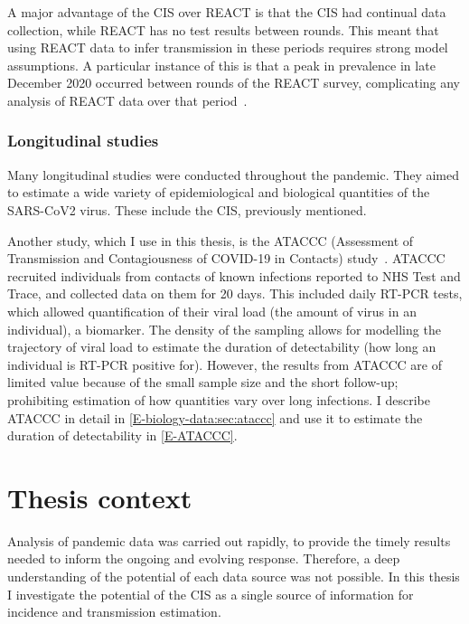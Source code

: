 \documentclass[thesis.tex]{subfiles}
\begin{document}
A major advantage of the CIS over REACT is that the CIS had continual data collection, while REACT has no test results between rounds.
This meant that using REACT data to infer transmission in these periods requires strong model assumptions.
A particular instance of this is that a peak in prevalence in late December 2020 occurred between rounds of the REACT survey, complicating any analysis of REACT data over that period~\autocite{rileyREACTround8}.

\subsubsection{Longitudinal studies}

Many longitudinal studies were conducted throughout the pandemic.
They aimed to estimate a wide variety of epidemiological and biological quantities of the SARS-CoV2 virus.
These include the CIS, previously mentioned.

Another study, which I use in this thesis, is the ATACCC (Assessment of Transmission and Contagiousness of COVID-19 in Contacts) study~\autocite{singanayagamCommunity,hakkiOnset}.
ATACCC recruited individuals from contacts of known infections reported to NHS Test and Trace, and collected data on them for 20 days.
This included daily RT-PCR tests, which allowed quantification of their viral load (the amount of virus in an individual), a biomarker.
The density of the sampling allows for modelling the trajectory of viral load to estimate the duration of detectability (how long an individual is RT-PCR positive for).
However, the results from ATACCC are of limited value because of the small sample size and the short follow-up; prohibiting estimation of how quantities vary over long infections.
I describe ATACCC in detail in \cref{E-biology-data:sec:ataccc} and use it to estimate the duration of detectability in \cref{E-ATACCC}.

\section{Thesis context}

Analysis of pandemic data was carried out rapidly, to provide the timely results needed to inform the ongoing and evolving response.
Therefore, a deep understanding of the potential of each data source was not possible.
In this thesis I investigate the potential of the CIS as a single source of information for incidence and transmission estimation.
\end{document}
